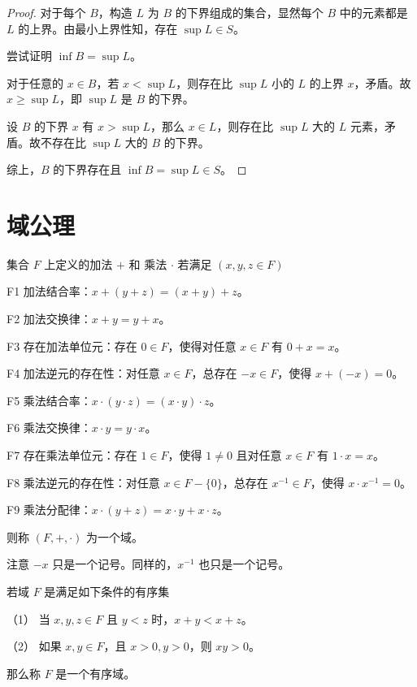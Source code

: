 \begin{proof}
	对于每个 $B$，构造 $L$ 为 $B$ 的下界组成的集合，显然每个 $B$ 中的元素都是 $L$ 的上界。由最小上界性知，存在 $\sup L \in S$。

	尝试证明 $\inf B=\sup L$。
	
	对于任意的 $x\in B$，若 $x<\sup L$，则存在比 $\sup L$ 小的 $L$ 的上界 $x$，矛盾。故 $x \geqslant \sup L$，即 $\sup L$ 是 $B$ 的下界。

	设 $B$ 的下界 $x$ 有 $x>\sup L$，那么 $x\in L$，则存在比 $\sup L$ 大的 $L$ 元素，矛盾。故不存在比 $\sup L$ 大的 $B$ 的下界。

	综上，$B$ 的下界存在且 $\inf B=\sup L \in S$。
\end{proof}

\section{域公理}

集合 $F$ 上定义的加法 $+$ 和 乘法 $\cdot$ 若满足 $(x,y,z\in F)$

F1 加法结合率：$x+(y+z) = (x+y)+z$。

F2 加法交换律：$x+y = y+x$。

F3 存在加法单位元：存在 $0\in F$，使得对任意 $x\in F$ 有 $0+x=x$。

F4 加法逆元的存在性：对任意 $x\in F$，总存在 $-x\in F$，使得 $x+(-x)=0$。

F5 乘法结合率：$x\cdot (y\cdot z) = (x\cdot y)\cdot z$。

F6 乘法交换律：$x\cdot y = y\cdot x$。

F7 存在乘法单位元：存在 $1\in F$，使得 $1\ne 0$ 且对任意 $x\in F$ 有 $1\cdot x=x$。

F8 乘法逆元的存在性：对任意 $x\in F-\{0\}$，总存在 $x^{-1}\in F$，使得 $x\cdot x^{-1} =0$。

F9 乘法分配律：$x \cdot (y+z) = x\cdot y + x\cdot z$。

则称 $(F,+,\cdot)$ 为一个域。

注意 $-x$ 只是一个记号。同样的，$x^{-1}$ 也只是一个记号。

\begin{definition}[有序域]
	若域 $F$ 是满足如下条件的有序集

	（1） 当 $x,y,z\in F$ 且 $y<z$ 时，$x+y<x+z$。

	（2） 如果 $x,y\in F$，且 $x>0,y>0$，则 $xy>0$。

	那么称 $F$ 是一个有序域。
\end{definition}

